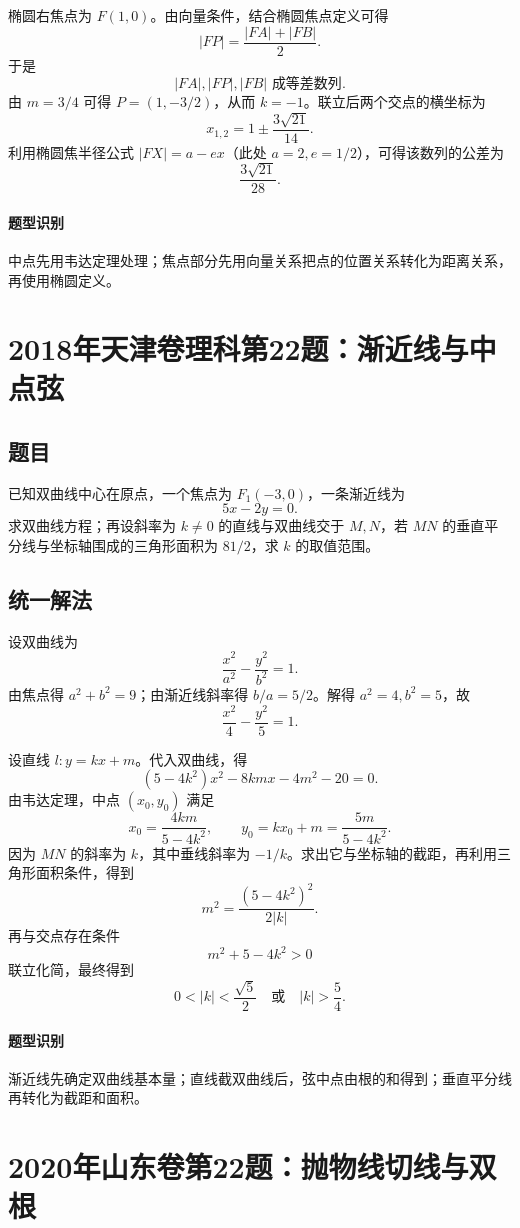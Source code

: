 \documentclass[11pt,a4paper]{ctexart}
\begin{document}
椭圆右焦点为 $F(1,0)$。由向量条件，结合椭圆焦点定义可得
\[
|FP|=\frac{|FA|+|FB|}{2}.
\]
于是
\[
\boxed{|FA|,|FP|,|FB|\text{ 成等差数列}}.
\]
由 $m=3/4$ 可得 $P=(1,-3/2)$，从而 $k=-1$。联立后两个交点的横坐标为
\[
x_{1,2}=1\pm\frac{3\sqrt{21}}{14}.
\]
利用椭圆焦半径公式 $|FX|=a-ex$（此处 $a=2,e=1/2$），可得该数列的公差为
\[
\boxed{\frac{3\sqrt{21}}{28}}.
\]

\paragraph{题型识别} 中点先用韦达定理处理；焦点部分先用向量关系把点的位置关系转化为距离关系，再使用椭圆定义。

\section{2018年天津卷理科第22题：渐近线与中点弦}

\subsection*{题目}
已知双曲线中心在原点，一个焦点为 $F_1(-3,0)$，一条渐近线为
\[
5x-2y=0.
\]
求双曲线方程；再设斜率为 $k\ne0$ 的直线与双曲线交于 $M,N$，若 $MN$ 的垂直平分线与坐标轴围成的三角形面积为 $81/2$，求 $k$ 的取值范围。

\subsection*{统一解法}
设双曲线为
\[
\frac{x^2}{a^2}-\frac{y^2}{b^2}=1.
\]
由焦点得 $a^2+b^2=9$；由渐近线斜率得 $b/a=5/2$。解得 $a^2=4,b^2=5$，故
\[
\boxed{\frac{x^2}{4}-\frac{y^2}{5}=1}.
\]

设直线 $l:y=kx+m$。代入双曲线，得
\[
(5-4k^2)x^2-8kmx-4m^2-20=0.
\]
由韦达定理，中点 $(x_0,y_0)$ 满足
\[
x_0=\frac{4km}{5-4k^2},\qquad
y_0=kx_0+m=\frac{5m}{5-4k^2}.
\]
因为 $MN$ 的斜率为 $k$，其中垂线斜率为 $-1/k$。求出它与坐标轴的截距，再利用三角形面积条件，得到
\[
m^2=\frac{(5-4k^2)^2}{2|k|}.
\]
再与交点存在条件
\[
m^2+5-4k^2>0
\]
联立化简，最终得到
\[
\boxed{0<|k|<\frac{\sqrt5}{2}\quad\text{或}\quad |k|>\frac54}.
\]

\paragraph{题型识别} 渐近线先确定双曲线基本量；直线截双曲线后，弦中点由根的和得到；垂直平分线再转化为截距和面积。

\section{2020年山东卷第22题：抛物线切线与双根}
\end{document}

